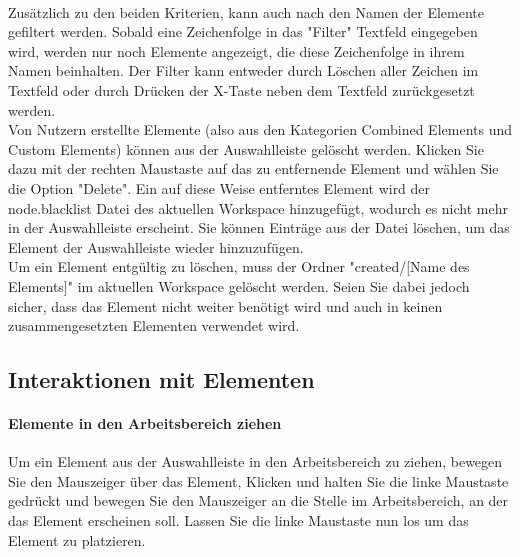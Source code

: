 \\
Zus\"atzlich zu den beiden Kriterien, kann auch nach den Namen der Elemente gefiltert werden. Sobald eine Zeichenfolge in das "Filter" Textfeld eingegeben wird, werden nur noch Elemente angezeigt, die diese Zeichenfolge in ihrem Namen beinhalten. Der Filter kann entweder durch L\"oschen aller Zeichen im Textfeld oder durch Dr\"ucken der X-Taste neben dem Textfeld zur\"uckgesetzt werden.
\\
Von Nutzern erstellte Elemente (also aus den Kategorien Combined Elements und Custom Elements) k\"onnen aus der Auswahlleiste gel\"oscht werden. Klicken Sie dazu mit der rechten Maustaste auf das zu entfernende Element und w\"ahlen Sie die Option "Delete". Ein auf diese Weise entferntes Element wird der node.blacklist Datei des aktuellen Workspace hinzugef\"ugt, wodurch es nicht mehr in der Auswahlleiste erscheint. Sie k\"onnen Eintr\"age aus der Datei l\"oschen, um das Element der Auswahlleiste wieder hinzuzuf\"ugen.
\\
Um ein Element entg\"ultig zu l\"oschen, muss der Ordner "created/[Name des Elements]" im aktuellen Workspace gel\"oscht werden. Seien Sie dabei jedoch sicher, dass das Element nicht weiter ben\"otigt wird und auch in keinen zusammengesetzten Elementen verwendet wird.

\subsection{Interaktionen mit Elementen} \label{sub:Interaktionen}
\paragraph{Elemente in den Arbeitsbereich ziehen}
Um ein Element aus der Auswahlleiste in den Arbeitsbereich zu ziehen, bewegen Sie den Mauszeiger \"uber das Element, Klicken und halten Sie die linke Maustaste gedr\"uckt und bewegen Sie den Mauszeiger an die Stelle im Arbeitsbereich, an der das Element erscheinen soll. Lassen Sie die linke Maustaste nun los um das Element zu platzieren.
